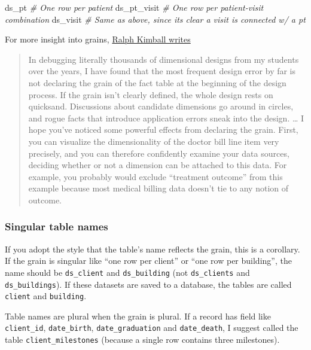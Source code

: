 \documentclass[
]{book}
\newenvironment{Shaded}{\begin{snugshade}}{\end{snugshade}}
\newcommand{\CommentTok}[1]{\textcolor[rgb]{0.56,0.35,0.01}{\textit{#1}}}
\newcommand{\NormalTok}[1]{#1}
\begin{document}
\begin{Shaded}
\begin{Highlighting}[]
\NormalTok{ds\_pt         }\CommentTok{\# One row per patient}
\NormalTok{ds\_pt\_visit   }\CommentTok{\# One row per patient{-}visit combination}
\NormalTok{ds\_visit      }\CommentTok{\# Same as above, since it\textquotesingle{}s clear a visit is connected w/ a pt}
\end{Highlighting}
\end{Shaded}

For more insight into grains, \href{https://www.kimballgroup.com/2003/03/declaring-the-grain/}{Ralph Kimball writes}

\begin{quote}
In debugging literally thousands of dimensional designs from my students over the years, I have found that the most frequent design error by far is not declaring the grain of the fact table at the beginning of the design process. If the grain isn't clearly defined, the whole design rests on quicksand. Discussions about candidate dimensions go around in circles, and rogue facts that introduce application errors sneak into the design.
\ldots{}
I hope you've noticed some powerful effects from declaring the grain. First, you can visualize the dimensionality of the doctor bill line item very precisely, and you can therefore confidently examine your data sources, deciding whether or not a dimension can be attached to this data. For example, you probably would exclude ``treatment outcome'' from this example because most medical billing data doesn't tie to any notion of outcome.
\end{quote}

\hypertarget{style-naming-datasets-singular}{%
\subsubsection{Singular table names}\label{style-naming-datasets-singular}}

If you adopt the style that the table's name reflects the grain, this is a corollary. If the grain is singular like ``one row per client'' or ``one row per building'', the name should be \texttt{ds\_client} and \texttt{ds\_building} (not \texttt{ds\_clients} and \texttt{ds\_buildings}). If these datasets are saved to a database, the tables are called \texttt{client} and \texttt{building}.

Table names are plural when the grain is plural. If a record has field like \texttt{client\_id}, \texttt{date\_birth}, \texttt{date\_graduation} and \texttt{date\_death}, I suggest called the table \texttt{client\_milestones} (because a single row contains three milestones).
\end{document}
